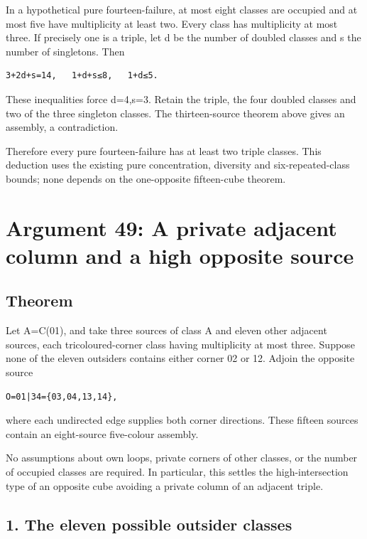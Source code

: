\documentclass[
  10pt,
]{article}
\begin{document}
In a hypothetical pure fourteen-failure, at most eight classes are
occupied and at most five have multiplicity at least two. Every class
has multiplicity at most three. If precisely one is a triple, let d be
the number of doubled classes and s the number of singletons. Then

\begin{verbatim}
3+2d+s=14,   1+d+s≤8,   1+d≤5.
\end{verbatim}

These inequalities force d=4,s=3. Retain the triple, the four doubled
classes and two of the three singleton classes. The thirteen-source
theorem above gives an assembly, a contradiction.

Therefore every pure fourteen-failure has at least two triple classes.
This deduction uses the existing pure concentration, diversity and
six-repeated-class bounds; none depends on the one-opposite fifteen-cube
theorem.

\hypertarget{arg-49}{%
\section{Argument 49: A private adjacent column and a high opposite
source}\label{arg-49}}

\hypertarget{theorem-1}{%
\subsection*{Theorem}\label{theorem-1}}

Let A=C(01), and take three sources of class A and eleven other adjacent
sources, each tricoloured-corner class having multiplicity at most
three. Suppose none of the eleven outsiders contains either corner 02 or
12. Adjoin the opposite source

\begin{verbatim}
O=01|34={03,04,13,14},
\end{verbatim}

where each undirected edge supplies both corner directions. These
fifteen sources contain an eight-source five-colour assembly.

No assumptions about own loops, private corners of other classes, or the
number of occupied classes are required. In particular, this settles the
high-intersection type of an opposite cube avoiding a private column of
an adjacent triple.

\hypertarget{the-eleven-possible-outsider-classes}{%
\subsection*{1. The eleven possible outsider
classes}\label{the-eleven-possible-outsider-classes}}
\end{document}

